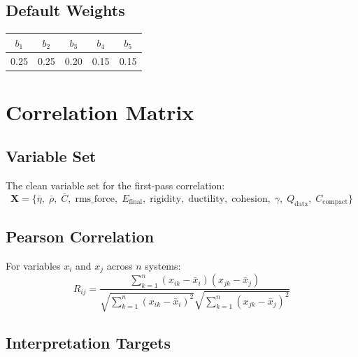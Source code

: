 \documentclass[11pt]{article}
\newcommand{\var}[1]{\ensuremath{\mathrm{#1}}}
\begin{document}
\subsection{Default Weights}

\begin{center}
\begin{tabular}{ccccc}
\toprule
$b_1$ & $b_2$ & $b_3$ & $b_4$ & $b_5$ \\
\midrule
0.25 & 0.25 & 0.20 & 0.15 & 0.15 \\
\bottomrule
\end{tabular}
\end{center}

\section{Correlation Matrix}
\label{sec:correlation}

\subsection{Variable Set}

The clean variable set for the first-pass correlation:
\begin{equation}
  \mathbf{X} = \bigl\{
    \bar{\eta},\;\bar{\rho},\;\bar{C},\;
    \var{rms\_force},\;E_\var{final},\;
    \var{rigidity},\;\var{ductility},\;\var{cohesion},\;
    \gamma,\;Q_\var{data},\;C_\var{compact}
  \bigr\}
\end{equation}

\subsection{Pearson Correlation}

For variables $x_i$ and $x_j$ across $n$ systems:
\begin{equation}
  R_{ij} = \frac{\sum_{k=1}^{n}(x_{ik}-\bar{x}_i)(x_{jk}-\bar{x}_j)}
                {\sqrt{\sum_{k=1}^{n}(x_{ik}-\bar{x}_i)^2}
                 \sqrt{\sum_{k=1}^{n}(x_{jk}-\bar{x}_j)^2}}
\end{equation}

\subsection{Interpretation Targets}
\end{document}
